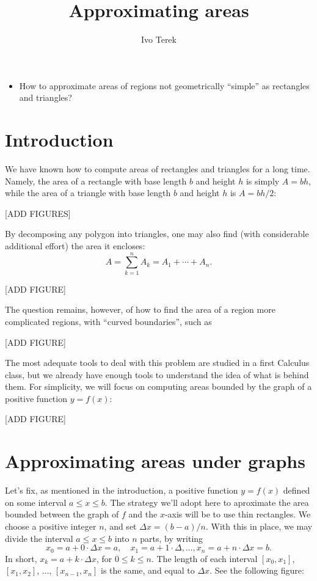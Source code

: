 \documentclass[nooutcomes]{ximera}
\author{Ivo Terek}
\title{Approximating areas}
\begin{document}
\begin{abstract}
  
\end{abstract}
\maketitle

\begin{motivatingQuestions}\begin{itemize}
	\item How to approximate areas of regions not geometrically ``simple'' as rectangles and triangles?
\end{itemize}\end{motivatingQuestions}

\section{Introduction}

We have known how to compute areas of rectangles and triangles for a long time. Namely, the area of a rectangle with base length $b$ and height $h$ is simply $A=bh$, while the area of a triangle with base length $b$ and height $h$ is $A = bh/2$:

[ADD FIGURES]

By decomposing any polygon into triangles, one may also find (with considerable additional effort) the area it encloses: $$A = \sum_{k=1}^n A_k = A_1+\cdots + A_n.$$

[ADD FIGURE]

The question remains, however, of how to find the area of a region more complicated regions, with ``curved boundaries'', such as

[ADD FIGURE]

The most adequate tools to deal with this problem are studied in a first Calculus class, but we already have enough tools to understand the idea of what is behind them. For simplicity, we will focus on computing areas bounded by the graph of a positive function $y=f(x)$:

[ADD FIGURE]

\section{Approximating areas under graphs}

Let's fix, as mentioned in the introduction, a positive function $y=f(x)$ defined on some interval $a \leq x \leq b$. The strategy we'll adopt here to aproximate the area bounded between the graph of $f$ and the $x$-axis will be to use thin rectangles. We choose a positive integer $n$, and set $\Delta x = (b-a)/n$. With this in place, we may divide the interval $a\leq x \leq b$ into $n$ parts, by writing $$x_0 = a+0\cdot \Delta x = a, \quad x_1 = a+1\cdot \Delta, \ldots, x_n = a + n\cdot \Delta x = b.$$In short, $x_k = a+k\cdot \Delta x$, for $0\leq k \leq n$. The length of each interval $[x_0,x_1]$, $[x_1,x_2]$, ..., $[x_{n-1},x_n]$ is the same, and equal to $\Delta x$. See the following figure:
\end{document}
